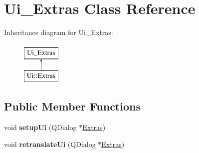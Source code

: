 \hypertarget{classUi__Extras}{
\section{Ui\_\-Extras Class Reference}
\label{classUi__Extras}
}
Inheritance diagram for Ui\_\-Extras:\begin{figure}[H]
\begin{center}
\leavevmode
\includegraphics[height=2.000000cm]{classUi__Extras}
\end{center}
\end{figure}
\subsection*{Public Member Functions}
\begin{DoxyCompactItemize}
\item 
\hypertarget{classUi__Extras_ae9081fb123d2b64bcb3fdf7301707af0}{
void {\bfseries setupUi} (QDialog $\ast$\hyperlink{classExtras}{Extras})}
\label{classUi__Extras_ae9081fb123d2b64bcb3fdf7301707af0}

\item 
\hypertarget{classUi__Extras_a91aeaa0a945f969c71283a2860f42495}{
void {\bfseries retranslateUi} (QDialog $\ast$\hyperlink{classExtras}{Extras})}
\label{classUi__Extras_a91aeaa0a945f969c71283a2860f42495}

\end{DoxyCompactItemize}
